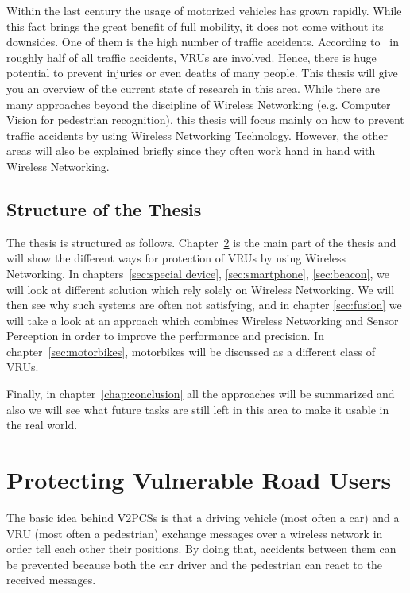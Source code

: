 \documentclass[]{ccs-thesis}
\begin{document}
Within the last century the usage of motorized vehicles has grown rapidly. While this fact brings the great benefit of full mobility, it does not come without its downsides. One of them is the high number of traffic accidents. According to~\cite{v2pcomm} in roughly half of all traffic accidents, \acp{VRU} are involved. Hence, there is huge potential to prevent injuries or even deaths of many people. This thesis will give you an overview of the current state of research in this area. While there are many approaches beyond the discipline of Wireless Networking (e.g. Computer Vision for pedestrian recognition), this thesis will focus mainly on how to prevent traffic accidents by using Wireless Networking Technology. However, the other areas will also be explained briefly since they often work hand in hand with Wireless Networking.

\section{Structure of the Thesis}
\label{sec:structure}

The thesis is structured as follows. Chapter~\ref{chap:v2p} is the main part of the thesis and will show the different ways for protection of \acp{VRU} by using Wireless Networking. In chapters~\ref{sec:special device}, \ref{sec:smartphone}, \ref{sec:beacon}, we will look at different solution which rely solely on Wireless Networking. We will then see why such systems are often not satisfying, and in chapter \ref{sec:fusion} we will take a look at an approach which combines Wireless Networking and Sensor Perception in order to improve the performance and precision. In chapter~\ref{sec:motorbikes}, motorbikes will be discussed as a different class of \acp{VRU}.

Finally, in chapter~\ref{chap:conclusion} all the approaches will be summarized and also we will see what future tasks are still left in this area to make it usable in the real world.


\chapter{Protecting Vulnerable Road Users}
\label{chap:v2p}

The basic idea behind \acp{V2PCS} is that a driving vehicle (most often a car) and a \ac{VRU} (most often a pedestrian) exchange messages over a wireless network in order tell each other their positions. By doing that, accidents between them can be prevented because both the car driver and the pedestrian can react to the received messages.
\end{document}
